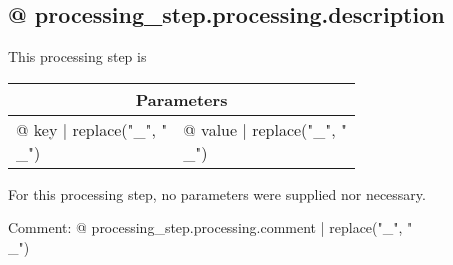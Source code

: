 \subsection{{@ processing_step.processing.description }}

This processing step is %

\vspace*{1ex}
\begin{tabular}{ll}
\toprule
\multicolumn{2}{c}{\textbf{Parameters}}
\\
\midrule
{@ key | replace("_", "\\_") } & {@ value | replace("_", "\\_") }
\\
\bottomrule
\end{tabular}
\vspace*{1ex}
For this processing step, no parameters were supplied nor necessary.

Comment: {@ processing_step.processing.comment | replace("_", "\\_") }
